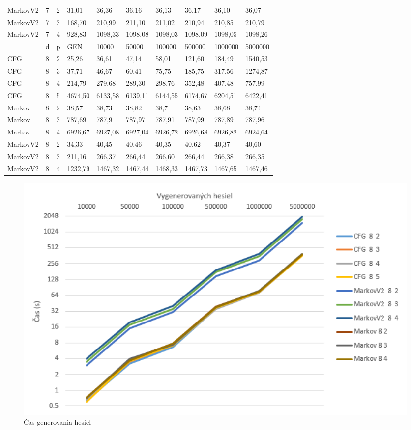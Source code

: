 \begin{table}[]
\begin{tabular}{lll|lllllll}
MarkovV2 & 7 & 2 & 31,01    & 36,36  & 36,16  & 36,13 & 36,17  & 36,10  & 36,07 \\
MarkovV2 & 7 & 3 & 168,70     & 210,99 & 211,10  & 211,02 & 210,94 & 210,85  & 210,79  \\
MarkovV2 & 7 & 4 & 928,83     & 1098,33   & 1098,08 & 1098,03 & 1098,09 & 1098,05  & 1098,26 \\ \hline
       & d & p & GEN     & 10000  & 50000  & 100000 & 500000 & 1000000 & 5000000 \\ \hline
CFG    & 8 & 2 & 25,26   & 36,61  & 47,14  & 58,01  & 121,60 & 184,49  & 1540,53 \\
CFG    & 8 & 3 & 37,71   & 46,67  & 60,41   & 75,75  & 185,75 & 317,56  & 1274,87 \\
CFG    & 8 & 4 & 214,79   & 279,68  & 289,30  & 298,76  & 352,48 & 407,48  & 757,99 \\
CFG    & 8 & 5 & 4674,50 & 6133,58 & 6139,11 & 6144,55 & 6174,67 & 6204,51 & 6422,41 \\
Markov & 8 & 2 & 38,57   & 38,73   & 38,82   & 38,7    & 38,63   & 38,68   & 38,74   \\
Markov & 8 & 3 & 787,69  & 787,9   & 787,97  & 787,91  & 787,99  & 787,89  & 787,96  \\
Markov & 8 & 4 & 6926,67 & 6927,08 & 6927,04 & 6926,72 & 6926,68 & 6926,82 & 6924,64 \\
MarkovV2 & 8 & 2 & 34,33     & 40,45  & 40,46  & 40,35 & 40,62 & 40,37 & 40,60 \\
MarkovV2 & 8 & 3 & 211,16    & 266,37  & 266,44  & 266,60 & 266,44 & 266,38  & 266,35 \\
MarkovV2 & 8 & 4 & 1232,79   & 1467,32 & 1467,44 & 1468,33 & 1467,73 & 1467,65  & 1467,46
\end{tabular}
\end{table} 

\begin{figure}[ht]
    \centering
    \includegraphics[width=1\textwidth]{generateTime}
    \caption{Čas generovania hesiel}
    \label{fig:generateTime}
\end{figure}

